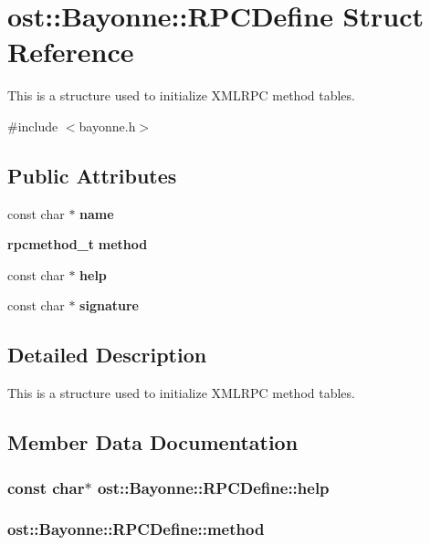 \section{ost::Bayonne::RPCDefine Struct Reference}
\label{structost_1_1_bayonne_1_1_r_p_c_define}


This is a structure used to initialize XMLRPC method tables.  


{\ttfamily \#include $<$bayonne.h$>$}\subsection*{Public Attributes}
\begin{DoxyCompactItemize}
\item 
const char $\ast$ {\bf name}
\item 
{\bf rpcmethod\_\-t} {\bf method}
\item 
const char $\ast$ {\bf help}
\item 
const char $\ast$ {\bf signature}
\end{DoxyCompactItemize}


\subsection{Detailed Description}
This is a structure used to initialize XMLRPC method tables. 

\subsection{Member Data Documentation}
\subsubsection[{help}]{\setlength{\rightskip}{0pt plus 5cm}const char$\ast$ {\bf ost::Bayonne::RPCDefine::help}}\label{structost_1_1_bayonne_1_1_r_p_c_define_a32cdcd160d309c8742d43ec66160045e}
\subsubsection[{method}]{ {\bf ost::Bayonne::RPCDefine::method}}\label{structost_1_1_bayonne_1_1_r_p_c_define_a7a7bc324d33c1de7ed07e6c833329625}
